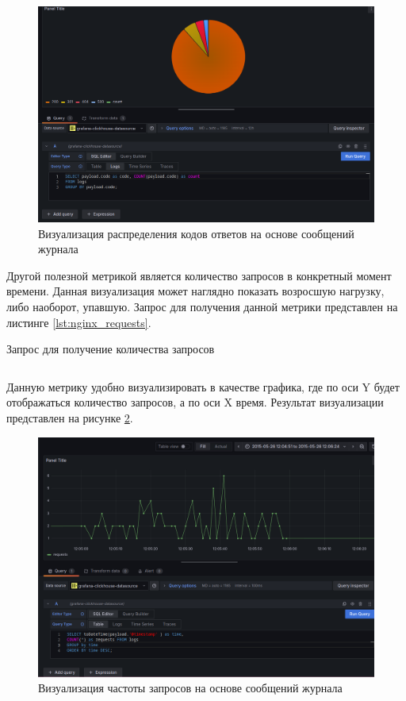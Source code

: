 \documentclass[14pt, russian]{scrartcl}
\begin{document}
\begin{figure}[H]
	\centering
	\centering
	\includegraphics[width=.7\textwidth]{./imgs/nginx_grafana_status_codes.png}
	\caption{Визуализация распределения кодов ответов на основе сообщений журнала}
	\label{fig:grafana_nginx_status_codes}
\end{figure}

Другой полезной метрикой является количество запросов в конкретный момент времени. Данная визуализация может наглядно показать возросшую нагрузку, либо наоборот, упавшую. Запрос для получения данной метрики представлен на листинге \ref{lst:nginx_requests}.  

\begin{listing}[H]
	\caption{Запрос для получение количества запросов}
	\label{lst:nginx_requests}
	\inputminted[style=bw, frame=single,fontsize = \footnotesize, linenos=false, xleftmargin = 1.5em]{sql}{./listings/grafana_nginx_requests.sql}
\end{listing}

Данную метрику удобно визуализировать в качестве графика, где по оси Y будет отображаться количество запросов, а по оси X время.
Результат визуализации представлен на рисунке \ref{fig:grafana_nginx_requests}. 

\begin{figure}[H]
	\centering
	\centering
	\includegraphics[width=.7\textwidth]{./imgs/nginx_grafana_requests.png}
	\caption{Визуализация частоты запросов на основе сообщений журнала}
	\label{fig:grafana_nginx_requests}
\end{figure}
\end{document}
